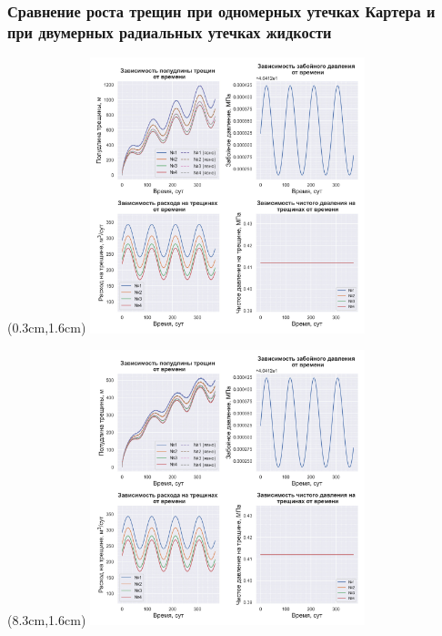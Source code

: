 \documentclass{beamer}
\begin{document}
\begin{frame}
\frametitle{Сравнение роста трещин при одномерных утечках Картера и при двумерных радиальных утечках жидкости}

\begin{textblock*}{8cm}(0.3cm,1.6cm)
\includegraphics[width=8cm]{myimage3.jpg}
\end{textblock*}

\begin{textblock*}{8cm}(8.3cm,1.6cm)
%
  {\includegraphics[width=8cm]{myimage4.jpg}}
\end{textblock*}

\end{frame}
\end{document}
